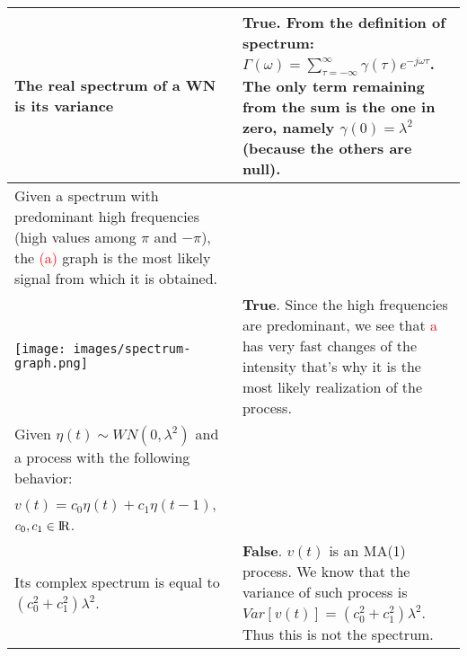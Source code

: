 \documentclass[10pt,a4paper]{article}
\begin{document}
\begin{center}
\begin{tabular}{ | m{200pt} | m{200pt}| }
\\ \hline
The real spectrum of a WN is its variance & \textbf{True}. From the definition of spectrum: $\Gamma(\omega)=\sum_{\tau=-\infty}^{\infty} \gamma(\tau)e^{-j \omega \tau}$. The only term remaining from the sum is the one in zero, namely $\gamma(0)=\lambda^2$ (because the others are null).
\\ \hline
Given a spectrum with predominant high frequencies (high values among $\pi$ and $-\pi$), the \textcolor{red}{(a)} graph is the most likely signal from which it is obtained. \\
\begin{minipage}{.4\textwidth}
      \texttt{[image: images/spectrum-graph.png]}
    \end{minipage}
      & \textbf{True}. Since the high frequencies are predominant, we see that \textcolor{red}{a} has very fast changes of the intensity that's why it is the most likely realization of the process.
      \\ \hline
      Given $\eta(t) \sim WN(0,\lambda^2)$ and a process with the following behavior: \\ $v(t)=c_0\eta(t)+c_1\eta(t-1)$, $c_0,c_1 \in {\rm I\!R}$. \\
      Its complex spectrum is equal to $(c_0^2+c_1^2)\lambda^2$.
      & \textbf{False}. $v(t)$ is an MA(1) process. We know that the variance of such process is $Var[v(t)]=(c_0^2+c_1^2)\lambda^2$. Thus this is not the spectrum.
      \\ \hline
     
\end{tabular}
\end{center}
\end{document}
